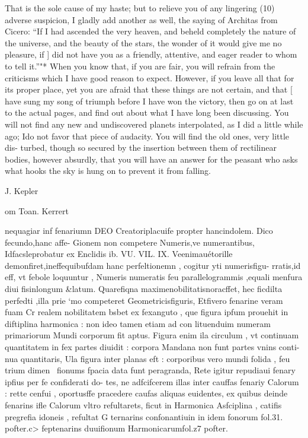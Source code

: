 \documentclass{article}
\begin{document}
{{{{{{{{{{{{{{That is the sole cause of my haste; but to relieve you of any lingering (10)
adverse suspicion, I gladly add another as well, the saying of Architas from
Cicero: “If I had ascended the very heaven, and beheld completely the nature of
the universe, and the beauty of the stars, the wonder of it would give me no
pleasure, if ] did not have you as a friendly, attentive, and eager reader to whom
to tell it.”"* When you know that, if you are fair, you will refrain from the
criticisms which I have good reason to expect. However, if you leave all that for
its proper place, yet you are afraid that these things are not certain, and that [
have sung my song of triumph before I have won the victory, then go on at last to
the actual pages, and find out about what I have long been discussing. You will
not find any new and undiscovered planets interpolated, as I did a little while ago;
Ido not favor that piece of audacity. You will find the old ones, very little dis-
turbed, though so secured by the insertion between them of rectilinear bodies,
however absurdly, that you will have an answer for the peasant who asks what
hooks the sky is hung on to prevent it from falling.

J. Kepler

om Toan. Kerrert

nequagiar inf fenariumn DEO Creatoriplacuife propter hancindolem. Dico fecundo,hanc affe-
Gionem non competere Numeris,ve numerantibus, Idfacsleprobatur ex Enclidis ib. VU. VIL.
IX. Veenimauétorille demonfiret,ineffequibufdam hanc perfeltionemn , cogitur yti numerisfigu-
rratis,id eff, vt febole loquuntur , Numeris numeratis feu parallelogrammis ,equali menfura diui
fisinlongum &latum. Quarefiqna maximenobilitatisnoracffet, hec ficdilta perfedti ,illa prie
‘mo competeret Geometricisfiguris, Etfivero fenarine veram fuam Cr realem nobilitatem bsbet ex
fexanguto , que figura ipfum prouehit in diftiplina harmonica : non ideo tamen etiam ad con
lituenduim numeram primariorum Mundi corporum fit aptus. Figura enim ila circulum , vt
continuam quantitatem in fex partes diuidit : corpora Mandana non funt partes vnins conti-
nua quantitaris, Ula figura inter planas eft : corporibus vero mundi folida , feu trium dimen~
fionums fpacia data funt peragranda, Rete igitur repudiaui fenary ipfius per fe confiderati do-
tes, ne adfcifcerem illas inter cauffas fenariy Calorum : rette cenfui , oportusffe pracedere caufas
aliquas euidentes, ex quibus deinde fenarins ifle Calorum vltro refultarets, ficut in Harmonica
Asfciplina , catifis pregrefia idoneis , refultat G ternarins confonantiuin in idem fonorum fol.31.
pofter.c> feptenarins duuifionum Harmonicarumfol.z7 pofter.

}}}}}}}}}}}}}}
\end{document}
